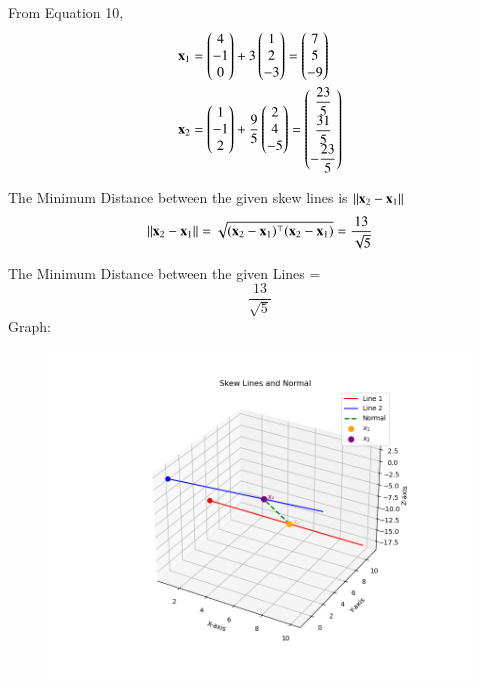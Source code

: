 \documentclass[journal,12pt,onecolumn]{IEEEtran}
\begin{document}
From Equation 10,
\begin{align}
\mathbf{x}_1 &= \begin{pmatrix}4 \\ -1 \\ 0\end{pmatrix} + 3\begin{pmatrix}1 \\ 2 \\ -3\end{pmatrix} = \begin{pmatrix}7 \\ 5 \\ -9\end{pmatrix} \\
\mathbf{x}_2 &= \begin{pmatrix}1 \\ -1 \\ 2\end{pmatrix} + \dfrac{9}{5}\begin{pmatrix}2 \\ 4 \\ -5\end{pmatrix} = \begin{pmatrix}\dfrac{23}{5} \\ \dfrac{31}{5} \\ -\dfrac{23}{5}\end{pmatrix}
\end{align}

The Minimum Distance between the given skew lines is $\left\lVert\mathbf{x}_2 - \mathbf{x}_1\right\rVert$\\
\begin{align}
\left\lVert\mathbf{x}_2 - \mathbf{x}_1\right\rVert = \sqrt{(\mathbf{x}_2 - \mathbf{x}_1)^\top (\mathbf{x}_2 - \mathbf{x}_1)} = \dfrac{13}{\sqrt{5}}
\end{align}

The Minimum Distance between the given Lines = $$\dfrac{13}{\sqrt{5}} $$
\newline
Graph:
\begin{figure}[H]
    \centering
    \includegraphics[scale=0.5]{plot}
    \caption{}
    \label{fig:plot}
\end{figure}
\end{document}
